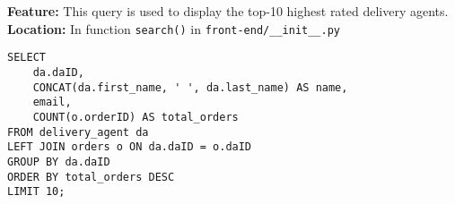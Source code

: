 \textbf{Feature:} This query is used to display the top-10 highest rated delivery agents. \\
\textbf{Location:} In function \texttt{search()} in \texttt{front-end/\_\_init\_\_.py}

\begin{lstlisting}
SELECT
    da.daID,
    CONCAT(da.first_name, ' ', da.last_name) AS name,
    email,
    COUNT(o.orderID) AS total_orders
FROM delivery_agent da
LEFT JOIN orders o ON da.daID = o.daID
GROUP BY da.daID
ORDER BY total_orders DESC
LIMIT 10;
\end{lstlisting}